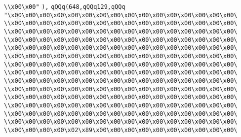 \verb|\\x00\x00"|\newline
\verb|),|\newline
\verb|qQQq(648,qQQq129,qQQq|\newline
\verb|"\x00\x00\x00\x00\x00\x00\x00\x00\x00\x00\x00\x00\x00\x00\x00\x00\|\newline
\verb|\\x00\x00\x00\x00\x00\x00\x00\x00\x00\x00\x00\x00\x00\x00\x00\x00\|\newline
\verb|\\x00\x00\x00\x00\x00\x00\x00\x00\x00\x00\x00\x00\x00\x00\x00\x00\|\newline
\verb|\\x00\x00\x00\x00\x00\x00\x00\x00\x00\x00\x00\x00\x00\x00\x00\x00\|\newline
\verb|\\x00\x00\x00\x00\x00\x00\x00\x00\x00\x00\x00\x00\x00\x00\x00\x00\|\newline
\verb|\\x00\x00\x00\x00\x00\x00\x00\x00\x00\x00\x00\x00\x00\x00\x00\x00\|\newline
\verb|\\x00\x00\x00\x00\x00\x00\x00\x00\x00\x00\x00\x00\x00\x00\x00\x00\|\newline
\verb|\\x00\x00\x00\x00\x00\x00\x00\x00\x00\x00\x00\x00\x00\x00\x00\x00\|\newline
\verb|\\x00\x00\x00\x00\x00\x00\x00\x00\x00\x00\x00\x00\x00\x00\x00\x00\|\newline
\verb|\\x00\x00\x00\x00\x00\x00\x00\x00\x00\x00\x00\x00\x00\x00\x00\x00\|\newline
\verb|\\x00\x00\x00\x00\x00\x00\x00\x00\x00\x00\x00\x00\x00\x00\x00\x00\|\newline
\verb|\\x00\x00\x00\x00\x00\x00\x00\x00\x00\x00\x00\x00\x00\x00\x00\x00\|\newline
\verb|\\x00\x00\x00\x00\x00\x00\x00\x00\x00\x00\x00\x00\x00\x00\x00\x00\|\newline
\verb|\\x00\x00\x00\x00\x00\x00\x00\x00\x00\x00\x00\x00\x00\x00\x00\x00\|\newline
\verb|\\x00\x00\x00\x00\x02\x89\x00\x00\x00\x00\x00\x00\x00\x00\x00\x00\|\newline
